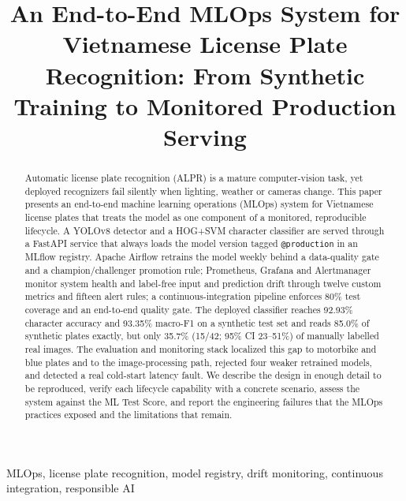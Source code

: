\documentclass[conference]{IEEEtran}
\newcommand{\code}[1]{\texttt{#1}}
\begin{document}
\title{An End-to-End MLOps System for Vietnamese License Plate Recognition: From Synthetic Training to Monitored Production Serving}

\author{
}

\maketitle

\begin{abstract}
Automatic license plate recognition (ALPR) is a mature computer-vision task, yet
deployed recognizers fail silently when lighting, weather or cameras change. This
paper presents an end-to-end machine learning operations (MLOps) system for
Vietnamese license plates that treats the model as one component of a monitored,
reproducible lifecycle. A YOLOv8 detector and a HOG+SVM character classifier are
served through a FastAPI service that always loads the model version tagged
\code{@production} in an MLflow registry. Apache Airflow retrains the model weekly
behind a data-quality gate and a champion/challenger promotion rule; Prometheus,
Grafana and Alertmanager monitor system health and label-free input and
prediction drift through twelve custom metrics and fifteen alert rules; a
continuous-integration pipeline enforces 80\% test coverage and an end-to-end
quality gate. The deployed classifier reaches 92.93\% character accuracy and
93.35\% macro-F1 on a synthetic test set and reads 85.0\% of synthetic plates
exactly, but only 35.7\% (15/42; 95\% CI 23--51\%) of manually labelled real
images. The evaluation and monitoring stack localized this gap to motorbike and
blue plates and to the image-processing path, rejected four weaker retrained
models, and detected a real cold-start latency fault. We describe the design in
enough detail to be reproduced, verify each lifecycle capability with a concrete
scenario, assess the system against the ML Test Score, and report the
engineering failures that the MLOps practices exposed and the limitations that
remain.
\end{abstract}

\begin{IEEEkeywords}
MLOps, license plate recognition, model registry, drift monitoring,
continuous integration, responsible AI
\end{IEEEkeywords}
\end{document}
